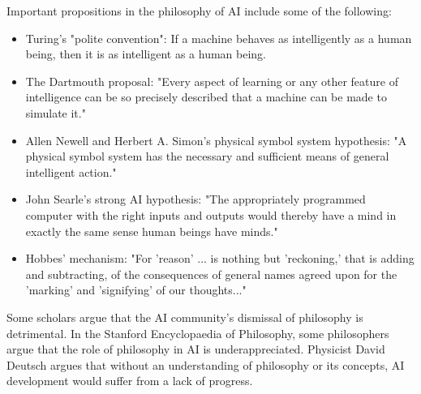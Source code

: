 \documentclass[12pt]{article}
\begin{document}
Important propositions in the philosophy of AI include some of the following:

\begin{itemize}
	\item Turing's "polite convention": If a machine behaves as intelligently as a human being, then it is as intelligent as a human being.

	\item The Dartmouth proposal: "Every aspect of learning or any other feature of intelligence can be so precisely described that a machine can be made to simulate it."

	\item Allen Newell and Herbert A. Simon's physical symbol system hypothesis: "A physical symbol system has the necessary and sufficient means of general intelligent action."

	\item John Searle's strong AI hypothesis: "The appropriately programmed computer with the right inputs and outputs would thereby have a mind in exactly the same sense human beings have minds."

	\item Hobbes' mechanism: "For 'reason' ... is nothing but 'reckoning,' that is adding and subtracting, of the consequences of general names agreed upon for the 'marking' and 'signifying' of our thoughts..."

\vspace{4\baselineskip}
\end{itemize}
Some scholars argue that the AI community's dismissal of philosophy is detrimental. In the Stanford Encyclopaedia of Philosophy, some philosophers argue that the role of philosophy in AI is underappreciated. Physicist David Deutsch argues that without an understanding of philosophy or its concepts, AI development would suffer from a lack of progress.
\end{document}
